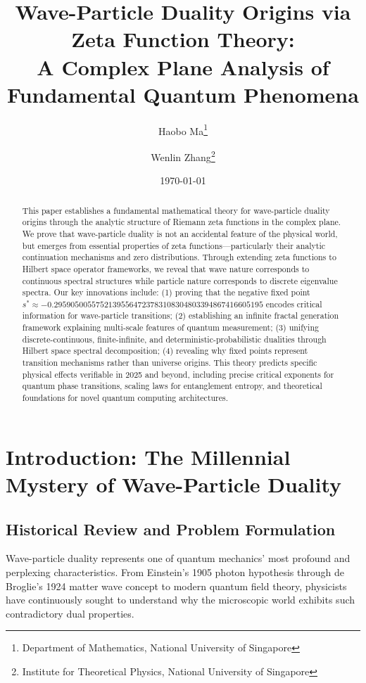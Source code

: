 \documentclass[11pt]{article}
\title{\textbf{Wave-Particle Duality Origins via Zeta Function Theory:\\A Complex Plane Analysis of Fundamental Quantum Phenomena}}
\author{
Haobo Ma\thanks{Department of Mathematics, National University of Singapore} \and
Wenlin Zhang\thanks{Institute for Theoretical Physics, National University of Singapore}
}
\date{\today}
\theoremstyle{plain}
\theoremstyle{definition}
\theoremstyle{remark}
\begin{document}
\maketitle

\begin{abstract}
This paper establishes a fundamental mathematical theory for wave-particle duality origins through the analytic structure of Riemann zeta functions in the complex plane. We prove that wave-particle duality is not an accidental feature of the physical world, but emerges from essential properties of zeta functions—particularly their analytic continuation mechanisms and zero distributions. Through extending zeta functions to Hilbert space operator frameworks, we reveal that wave nature corresponds to continuous spectral structures while particle nature corresponds to discrete eigenvalue spectra. Our key innovations include: (1) proving that the negative fixed point $s^* \approx -0.29590500557521395564723783108304803394867416605195$ encodes critical information for wave-particle transitions; (2) establishing an infinite fractal generation framework explaining multi-scale features of quantum measurement; (3) unifying discrete-continuous, finite-infinite, and deterministic-probabilistic dualities through Hilbert space spectral decomposition; (4) revealing why fixed points represent transition mechanisms rather than universe origins. This theory predicts specific physical effects verifiable in 2025 and beyond, including precise critical exponents for quantum phase transitions, scaling laws for entanglement entropy, and theoretical foundations for novel quantum computing architectures.
\end{abstract}

\section{Introduction: The Millennial Mystery of Wave-Particle Duality}

\subsection{Historical Review and Problem Formulation}

Wave-particle duality represents one of quantum mechanics' most profound and perplexing characteristics. From Einstein's 1905 photon hypothesis through de Broglie's 1924 matter wave concept to modern quantum field theory, physicists have continuously sought to understand why the microscopic world exhibits such contradictory dual properties.
\end{document}
